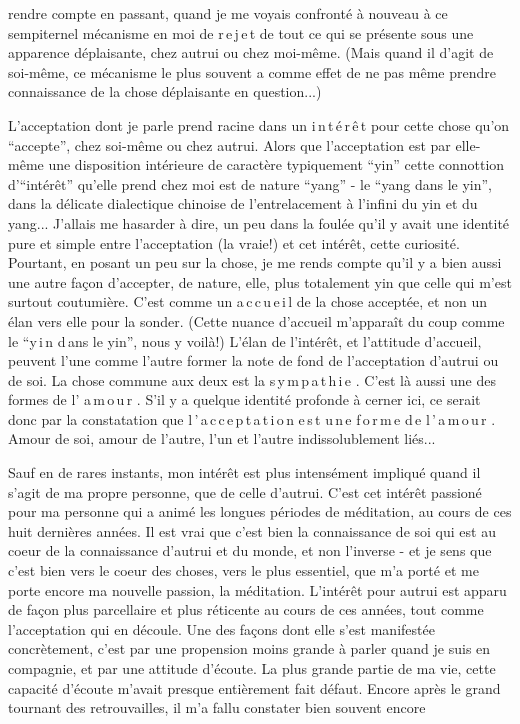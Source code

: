 
rendre compte en passant, quand je me voyais confronté à nouveau à ce sempiternel mécanisme en moi de r\,e\,j\,e\,t de tout ce qui se présente sous une apparence déplaisante, chez autrui ou chez moi-même. (Mais quand il d'agit de soi-même, ce mécanisme le plus souvent a comme effet de ne pas même prendre connaissance de la chose déplaisante en question...)

L'acceptation dont je parle prend racine dans un i\,n\,t\,é\,r\,ê\,t pour cette chose qu'on ``accepte'', chez soi-même ou chez autrui. Alors que l'acceptation est par elle-même une disposition intérieure de caractère typiquement ``yin''\unsure{:|,} cette connottion d'``intérêt'' qu'elle prend chez moi est de nature ``yang'' -  le ``yang dans le yin'', dans la délicate dialectique chinoise de l'entrelacement à l'infini du yin et du yang... J'allais me hasarder à dire, un peu dans la foulée\handwritten{,} qu'il y avait une identité pure et simple entre l'acceptation (la vraie!) et cet intérêt, cette curiosité. Pourtant, en posant un peu sur la chose, je me rends compte qu'il y a bien aussi une autre façon d'accepter, de nature, elle, plus totalement yin que celle qui m'est surtout coutumière. C'est comme un a\,c\,c\,u\,e\,i\,l de la chose acceptée, et non un élan vers elle pour la sonder. (Cette nuance d'accueil m'apparaît du coup comme le ``y\,i\,n d\,ans le yin'', nous y voilà!) L'élan de l'intérêt, et l'attitude d'accueil, peuvent l'une comme l'autre former la note de fond de l'acceptation d'autrui ou de soi. La chose commune aux deux est la s\,y\,m\,p\,a\,t\,h\,i\,e . C'est là aussi une des formes de l' a\,m\,o\,u\,r . S'il y a quelque identité profonde à cerner ici, ce serait donc par la constatation que l\,'\,a\,c\,c\,e\,p\,t\,a\,t\,i\,o\,n e\,s\,t u\,n\,e f\,o\,r\,m\,e d\,e l\,'\,a\,m\,o\,u\,r . Amour de soi, amour de l'autre, l'un et l'autre indissolublement liés...

Sauf en de rares instants, mon intérêt est plus intensément impliqué quand il s'agit de ma propre personne, que de celle d'autrui. C'est cet intérêt passioné pour ma personne qui a animé les longues périodes de méditation, au cours de ces huit dernières années. Il est vrai que c'est bien la connaissance de soi qui est au coeur de la connaissance d'autrui et du monde, et non l'inverse - et je sens que c'est bien vers le coeur des choses, vers le plus essentiel, que m'a porté et me porte encore ma nouvelle passion, la méditation. L'intérêt pour autrui est apparu de façon plus parcellaire et plus réticente au cours de ces années, tout comme l'acceptation qui en découle. Une des façons dont elle s'est manifestée concrètement, c'est par une propension moins grande à parler quand je suis en compagnie, et par une attitude d'écoute. La plus grande partie de ma vie, cette capacité d'écoute m'avait presque entièrement fait défaut. Encore après le grand tournant des retrouvailles, il m'a fallu constater bien souvent encore
